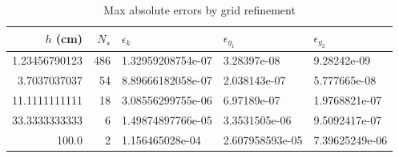 \documentclass[11pt]{article} %
\begin{document}
\begin{table}[H]
\centering
\begin{tabular}{r r|l l l}
$h$ (cm) & $N_s$ & $\epsilon_{k}$ & $\epsilon_{g_1}$ & $\epsilon_{g_2}$ \\ \hline
1.23456790123 & 486 & 1.32959208754e-07 & 3.28397e-08 & 9.28242e-09 \\
3.7037037037 & 54 & 8.89666182058e-07 & 2.038143e-07 & 5.777665e-08 \\
11.1111111111 & 18 & 3.08556299755e-06 & 6.97189e-07 & 1.9768821e-07 \\
33.3333333333 & 6 & 1.49874897766e-05 & 3.3531505e-06 & 9.5092417e-07 \\
100.0 & 2 & 1.156465028e-04 & 2.607958593e-05 & 7.39625249e-06
\end{tabular}
\caption{Max absolute errors by grid refinement}
\label{tab}
\end{table}
\end{document}

